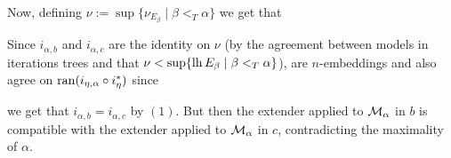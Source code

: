{\qquad Now, defining $\nu:=\sup\{\nu_{E_\beta}\mid\beta<_T\alpha\}$ we get that

Since $i_{\alpha,b}$ and $i_{\alpha,c}$ are the identity on $\nu$ (by the agreement between models in iterations trees and that $\nu<\sup\{\operatorname{lh} E_\beta\mid\beta<_T\alpha\}$), are $n$-embeddings and also agree on $\operatorname{ran}(i_{\eta,\alpha}\circ i_\eta^*)$ since

we get that $i_{\alpha,b}=i_{\alpha,c}$ by $(1)$. But then the extender applied to $\operatorname{\mathcal{M}}_\alpha$ in $b$ is compatible with the extender applied to $\operatorname{\mathcal{M}}_\alpha$ in $c$, contradicting the maximality of $\alpha$.
}



